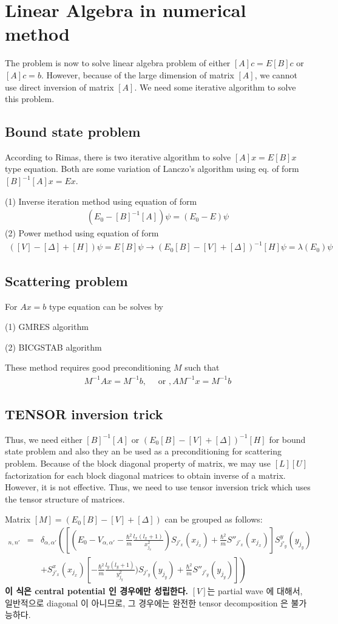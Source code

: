 \documentclass[11pt]{article}
\newcommand{\bea}{\begin{eqnarray}}
\newcommand{\eea}{\end{eqnarray}}
\newcommand{\no}{\nonumber \\}
\begin{document}
\section{Linear Algebra in numerical method}
The problem is now to solve linear algebra problem
of either $[A]c=E[B]c$ or $[A]c=b$. However, because of the
large dimension of matrix $[A]$, we cannot use direct
inversion of matrix $[A]$. We need some iterative 
algorithm to solve this problem.

\subsection{Bound state problem}
According to Rimas, there is two iterative algorithm to solve
$[A]x=E[B]x$ type equation. Both are some variation of
Lanczo's algorithm using eq. of form $[B]^{-1}[A]x=E x$.

(1) Inverse iteration method using equation of form
\bea
(E_0-[B]^{-1}[A])\psi=(E_0-E)\psi
\eea
(2) Power method using equation of form
\bea
([V]-[\Delta]+[H])\psi=E[B]\psi\to 
(E_0[B]-[V]+[\Delta])^{-1}[H]\psi=\lambda(E_0)\psi
\eea
\subsection{Scattering problem}
For $Ax=b$ type equation can be solves by

(1) GMRES algorithm

(2) BICGSTAB algorithm

These method requires good preconditioning $M$ such that
\bea
M^{-1}Ax=M^{-1}b,\quad\mbox{ or }, A M^{-1}x=M^{-1}b
\eea

\subsection{TENSOR inversion trick}
Thus, we need either $[B]^{-1}[A]$ or
$(E_0[B]-[V]+[\Delta])^{-1}[H]$ for bound state problem and
also they an be used as a preconditioning for scattering problem.
Because of the block diagonal property of matrix,
we may use $[L][U]$ factorization for 
each block diagonal matrices to obtain inverse of a matrix.
However, it is not effective. Thus, we need to use
tensor inversion trick
which uses the tensor structure of matrices.

Matrix $[M]=(E_0[B]-[V]+[\Delta])$ can be grouped as follows:
\bea
[M]_{n,n'}&=&\delta_{\alpha,\alpha'}
     \left( \left[(E_0-V_{\alpha,\alpha'}
     -\frac{\hbar^2}{m}\frac{l_x(l_x+1)}{x_{j_x}^2}) 
     S_{j'_x}(x_{j_x})
     +\frac{\hbar^2}{m}S''_{j'_x}(x_{j_x})\right] 
     S^y_{j'_y}(y_{j_y}) \right.\no & &\left.
     +S^x_{j'_x}(x_{j_x})
     \left[-\frac{\hbar^2}{m}\frac{l_y(l_y+1)}{y_{j_y}^2})
     S_{j'_y}(y_{j_y})
     +\frac{\hbar^2}{m}S''_{j'_y}(y_{j_y})\right]
     \right)
\eea
{\bf 이 식은 central potential 인 경우에만 성립한다.} 
$[V]$는 partial wave 에 대해서,
일반적으로 diagonal 이 아니므로, 그 경우에는
완전한 tensor decomposition 은 불가능하다. 
\end{document}
